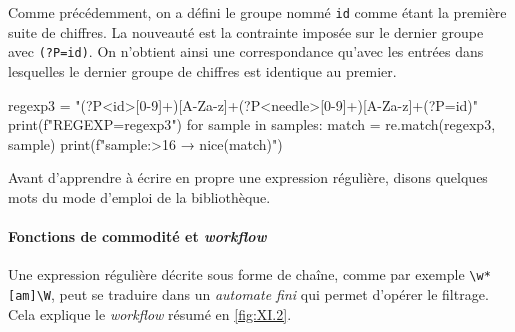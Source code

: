 Comme précédemment, on a défini le groupe nommé \texttt{id} comme étant la première suite de chiffres. La nouveauté est la contrainte imposée sur le dernier groupe avec \lstinline[basicstyle={\small\shellttfont}]{(?P=id)}. On n'obtient ainsi une correspondance qu'avec les entrées dans lesquelles le dernier groupe de chiffres est identique au premier.

\begin{idleconsole*}
	\begin{pyconsole}
regexp3 = "(?P<id>[0-9]+)[A-Za-z]+(?P<needle>[0-9]+)[A-Za-z]+(?P=id)"
print(f"REGEXP={regexp3}\n")
for sample in samples:
    match = re.match(regexp3, sample)
    print(f"{sample:>16} → {nice(match)}")

\end{pyconsole}
\end{idleconsole*}

\vspace{1pt}


Avant d'apprendre à écrire en propre une expression régulière, disons quelques mots du mode d'emploi de la bibliothèque.

\paragraph{Fonctions de commodité et \textit{workflow}}
Une expression régulière décrite sous forme de chaîne, comme par exemple \lstinline[basicstyle={\small\shellttfont}]{\w*[am]\W}, peut se traduire dans un \textit{automate fini} qui permet d'opérer le filtrage. Cela explique le \textit{workflow} résumé en \cref{fig:XI.2}.

